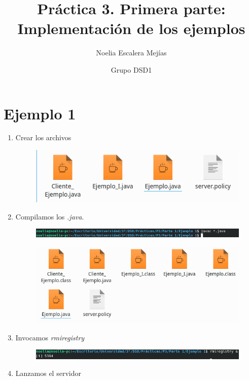 \documentclass{article}
\title{Práctica 3. Primera parte: Implementación de los ejemplos}
\author{Noelia Escalera Mejías \and Grupo DSD1}
\begin{document}
	\maketitle
	\section{Ejemplo 1}
	\begin{enumerate}
		\item Crear los archivos
		\begin{figure}[H]
			\centering
			\includegraphics[totalheight=2cm]{img/1.png}
		\end{figure}
		\item Compilamos los {\it .java}.
		\begin{figure}[H]
			\centering
			\includegraphics[totalheight=0.5cm]{img/2.png}
		\end{figure}
		\begin{figure}[H]
			\centering
			\includegraphics[totalheight=4cm]{img/3.png}
		\end{figure}
		\item Invocamos {\it rmiregistry}
		\begin{figure}[H]
			\centering
			\includegraphics[totalheight=0.55cm]{img/4.png}
		\end{figure}
		\item Lanzamos el servidor
		\begin{figure}[H]
			\centering

\end{figure}
\end{enumerate}
\end{document}
